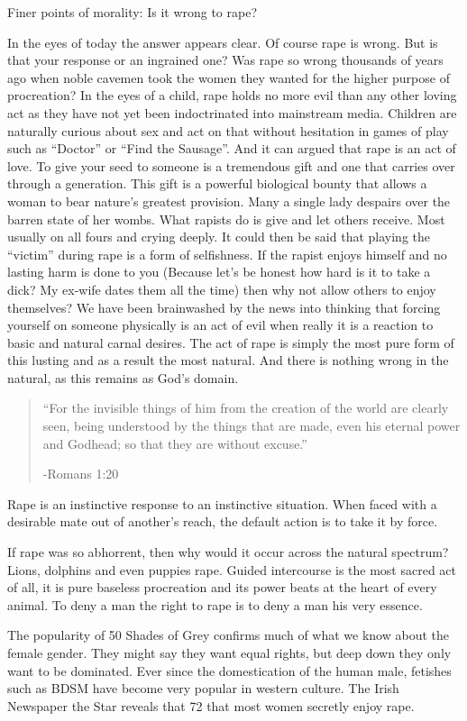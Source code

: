 Finer points of morality: Is it wrong to rape?


In the eyes of today the answer appears clear. Of course rape is wrong. But is
that your response or an ingrained one? Was rape so wrong thousands of years ago
when noble cavemen took the women they wanted for the higher purpose of
procreation? In the eyes of a child, rape holds no more evil than any other
loving act as they have not yet been indoctrinated into mainstream media.
Children are naturally curious about sex and act on that without hesitation in
games of play such as “Doctor” or “Find the Sausage”. And it can argued that
rape is an act of love. To give your seed to someone is a tremendous gift and
one that carries over through a generation. This gift is a powerful
biological bounty that allows a woman to bear nature’s greatest provision. Many
a single lady despairs over the barren state of her wombs. What rapists do is
give and let others receive. Most usually on all fours and crying deeply.
It could then be said that playing the “victim” during rape is a form of
selfishness. If the rapist enjoys himself and no lasting harm is done to you
(Because let’s be honest how hard is it to take a dick? My ex-wife dates them
all the time) then why not allow others to enjoy themselves? We have been
brainwashed by the news into thinking that forcing yourself on someone
physically is an act of evil when really it is a reaction to basic and natural
carnal desires. The act of rape is simply the most pure form of this lusting and
as a result the most natural. And there is nothing wrong in the natural, as this
remains as God’s domain.


\begin{quote}
“For the invisible things of him from the creation of the world are clearly
seen, being understood by the things that are made, even his eternal power and
Godhead; so that they are without excuse.”

-Romans 1:20
\end{quote}

Rape is an instinctive response to an instinctive situation. When faced with a
desirable mate out of another’s reach, the default action is to take it by 
force.


If rape was so abhorrent, then why would it occur across the natural spectrum?
Lions, dolphins and even puppies rape. Guided intercourse is the most sacred act 
of all, it is pure baseless procreation and its power beats at the heart of every
animal. To deny a man the right to rape is to deny a man his very essence.


The popularity of 50 Shades of Grey confirms much of what we know about the 
female gender. They might say they want equal rights, but deep down they only 
want to be dominated. Ever since the domestication of the human male, fetishes 
such as BDSM have become very popular in western culture. The Irish Newspaper 
the Star reveals that 72%
that most women secretly enjoy rape. 